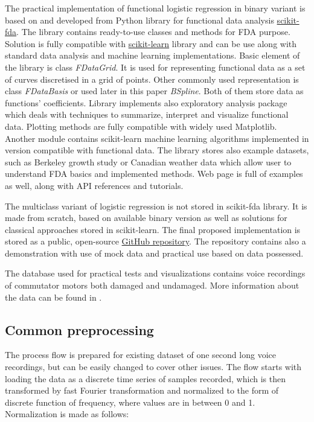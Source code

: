 \documentclass[energies,article,submit,pdftex,moreauthors]{Definitions/mdpi}
\begin{document}
The practical implementation of functional logistic regression in binary variant is based on and developed from Python library for functional data analysis \href{https://fda.readthedocs.io/en/latest/index.html}{scikit-fda}. The library contains ready-to-use classes and methods for FDA purpose. Solution is fully compatible with \href{https://scikit-learn.org/}{scikit-learn} library and can be use along with standard data analysis and machine learning implementations. Basic element of the library is class \textit{FDataGrid}. It is used for representing functional data as a set of curves discretised in a grid of points. Other commonly used representation is class \textit{FDataBasis} or used later in this paper \textit{BSpline}. Both of them store data as functions' coefficients. Library implements also exploratory analysis package which deals with techniques to summarize, interpret and visualize functional data. Plotting methods are fully compatible with widely used Matplotlib. Another module contains scikit-learn machine learning algorithms implemented in version compatible with functional data. The library stores also example datasets, such as Berkeley growth study or Canadian weather data which allow user to understand FDA basics and implemented methods. Web page is full of examples as well, along with API references and tutorials.

The multiclass variant of logistic regression is not stored in scikit-fda library. It is made from scratch, based on available binary version as well as solutions for classical approaches stored in scikit-learn. The final proposed implementation is stored as a public, open-source \href{https://github.com/Porbi96/fda-time-series-classification}{GitHub repository}. The repository contains also a demonstration with use of mock data and practical use based on data possessed.

The database used for practical tests and visualizations contains voice recordings of commutator motors both damaged and undamaged. More information about the data can be found in \cite{ref-motors}.


\subsection{Common preprocessing}

The process flow is prepared for existing dataset of one second long voice recordings, but can be easily changed to cover other issues. The flow starts with loading the data as a discrete time series of samples recorded, which is then transformed by fast Fourier transformation and normalized to the form of discrete function of frequency, where values are in between 0 and 1. Normalization is made as follows:
\end{document}
